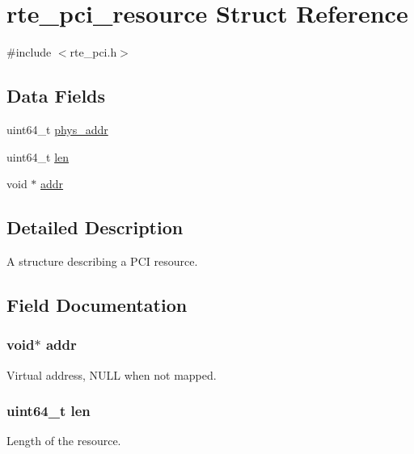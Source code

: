 \hypertarget{structrte__pci__resource}{}\section{rte\+\_\+pci\+\_\+resource Struct Reference}
\label{structrte__pci__resource}


{\ttfamily \#include $<$rte\+\_\+pci.\+h$>$}

\subsection*{Data Fields}
\begin{DoxyCompactItemize}
\item 
uint64\+\_\+t \hyperlink{structrte__pci__resource_a09dd0be16c2bf772f79e04c7b881b61a}{phys\+\_\+addr}
\item 
uint64\+\_\+t \hyperlink{structrte__pci__resource_accdb2dff228b7a3ea4c3f61937a82412}{len}
\item 
void $\ast$ \hyperlink{structrte__pci__resource_ae5bd6c22dbf0f6b5b0ae0233f8eb3704}{addr}
\end{DoxyCompactItemize}


\subsection{Detailed Description}
A structure describing a P\+C\+I resource. 

\subsection{Field Documentation}
\hypertarget{structrte__pci__resource_ae5bd6c22dbf0f6b5b0ae0233f8eb3704}{}
\subsubsection[{addr}]{\setlength{\rightskip}{0pt plus 5cm}void$\ast$ addr}\label{structrte__pci__resource_ae5bd6c22dbf0f6b5b0ae0233f8eb3704}
Virtual address, N\+U\+L\+L when not mapped. \hypertarget{structrte__pci__resource_accdb2dff228b7a3ea4c3f61937a82412}{}
\subsubsection[{len}]{\setlength{\rightskip}{0pt plus 5cm}uint64\+\_\+t len}\label{structrte__pci__resource_accdb2dff228b7a3ea4c3f61937a82412}
Length of the resource. \hypertarget{structrte__pci__resource_a09dd0be16c2bf772f79e04c7b881b61a}{}
